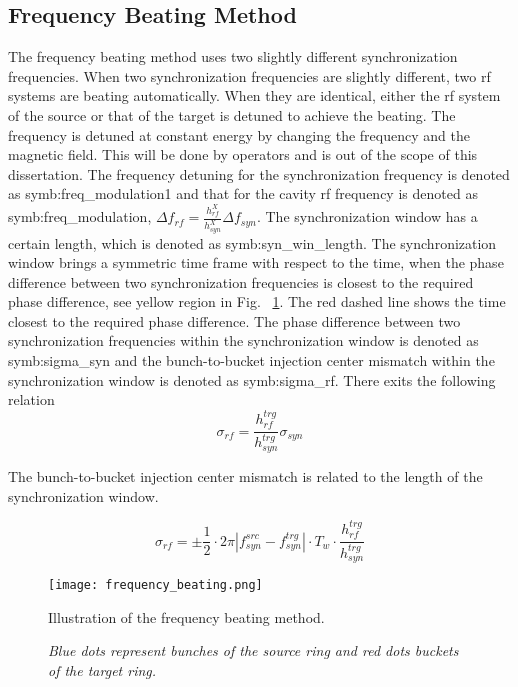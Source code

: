 
\subsection{Frequency Beating Method}
\label{subsec:beating}

The frequency beating method uses two slightly different synchronization frequencies. When two synchronization frequencies are slightly different, two rf systems are beating automatically. When they are identical, either the rf system of the source or that of the target is detuned to achieve the beating. The frequency is detuned at constant energy by changing the frequency and the magnetic field. This will be done by operators and is out of the scope of this dissertation. The frequency detuning for the synchronization frequency is denoted as \gls{symb:freq_modulation1} and that for the cavity rf frequency is denoted as \gls{symb:freq_modulation},  $\Delta f_\mathit{rf}=\frac{h_{\mathit{rf}}^\mathit{X}}{h_{\mathit{syn}}^\mathit{X}} \Delta f_\mathit{syn}$. The synchronization window has a certain length, which is denoted as \gls{symb:syn_win_length}. The synchronization window brings a symmetric time frame with respect to the time, when the phase difference between two synchronization frequencies is closest to the required phase difference, see yellow region in Fig. ~\ref{frequency_beat}. The red dashed line shows the time closest to the required phase difference. The phase difference between  two synchronization frequencies within the synchronization window is denoted as \gls{symb:sigma_syn} and the bunch-to-bucket injection center mismatch within the synchronization window is denoted as \gls{symb:sigma_rf}. There exits the following relation
\begin{equation}
\sigma_\mathit{rf}=\frac{h_{\mathit{rf}}^\mathit{trg}}{h_{\mathit{syn}}^\mathit{trg}}\sigma_\mathit{syn}
\end{equation}

The bunch-to-bucket injection center mismatch is related to the length of the synchronization window. %

\begin{equation}
\sigma_\mathit{rf}=\pm \frac{1}{2}\cdot 2\pi|f_{\mathit{syn}}^\mathit{src}-f_{\mathit{syn}}^\mathit{trg}|\cdot T_\mathit{w} \cdot \frac{h_{\mathit{rf}}^\mathit{trg}}{h_{\mathit{syn}}^\mathit{trg}}\label{phase_mismatch_win}
\end{equation}
\begin{figure}[!htb]
   \centering   
   \texttt{[image: frequency\_beating.png]}
   \caption{Illustration of the frequency beating method.}
	\caption*{\textsl{\small{Blue dots represent bunches of the source ring and red dots buckets of the target ring.}}}
   \label{frequency_beat}
\end{figure}


